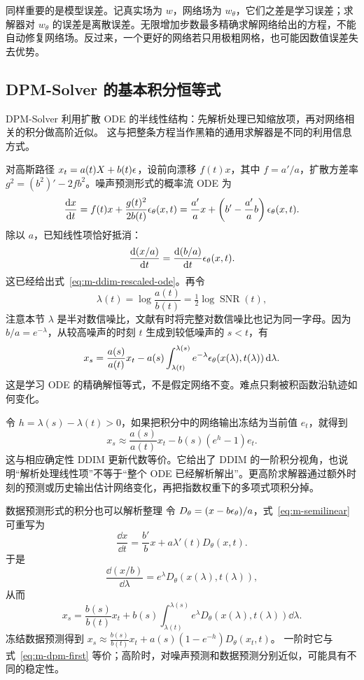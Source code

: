 同样重要的是模型误差。记真实场为 $w$，网络场为 $w_\theta$，它们之差是学习误差；求解器对 $w_\theta$ 的误差是离散误差。无限增加步数最多精确求解网络给出的方程，不能自动修复网络场。反过来，一个更好的网络若只用极粗网格，也可能因数值误差失去优势。

\subsection{DPM-Solver 的基本积分恒等式}

DPM-Solver 利用扩散 ODE 的半线性结构：先解析处理已知缩放项，再对网络相关的积分做高阶近似。\cite{m_dpmsolver} 这与把整条方程当作黑箱的通用求解器是不同的利用信息方式。

对高斯路径 $x_t=a(t)X+b(t)\epsilon$，设前向漂移
$f(t)x$，其中 $f=a'/a$，扩散方差率
$g^2=(b^2)'-2fb^2$。噪声预测形式的概率流 ODE 为
\begin{equation}
\frac{\mathop{}\!\mathrm{d} x}{\mathop{}\!\mathrm{d} t}
=f(t)x+\frac{g(t)^2}{2b(t)}\epsilon_\theta(x,t)
=\frac{a'}{a}x+\left(b'-\frac{a'}{a}b\right)\epsilon_\theta(x,t).
\label{eq:m-semilinear}
\end{equation}
除以 $a$，已知线性项恰好抵消：
\[
 \frac{\mathop{}\!\mathrm{d}(x/a)}{\mathop{}\!\mathrm{d} t}
 =\frac{\mathop{}\!\mathrm{d}(b/a)}{\mathop{}\!\mathrm{d} t}\epsilon_\theta(x,t).
\]
这已经给出式~\eqref{eq:m-ddim-rescaled-ode}。再令
\[
 \lambda(t)=\log\frac{a(t)}{b(t)}
 =\tfrac12\log\operatorname{SNR}(t),
\]
注意本节 $\lambda$ 是半对数信噪比，文献有时将完整对数信噪比也记为同一字母。因为 $b/a=e^{-\lambda}$，从较高噪声的时刻 $t$ 生成到较低噪声的 $s<t$，有
\begin{equation}
x_s=\frac{a(s)}{a(t)}x_t
-a(s)\int_{\lambda(t)}^{\lambda(s)}
e^{-\lambda}\epsilon_\theta(x(\lambda),t(\lambda))\mathop{}\!\mathrm{d}\lambda.
\label{eq:m-dpm-exact}
\end{equation}
这是学习 ODE 的精确解恒等式，不是假定网络不变。难点只剩被积函数沿轨迹如何变化。

令 $h=\lambda(s)-\lambda(t)>0$，如果把积分中的网络输出冻结为当前值 $e_t$，就得到
\begin{equation}
x_s\approx\frac{a(s)}{a(t)}x_t
-b(s)(e^h-1)e_t.
\label{eq:m-dpm-first}
\end{equation}
这与相应确定性 DDIM 更新代数等价。它给出了 DDIM 的一阶积分视角，也说明“解析处理线性项”不等于“整个 ODE 已经解析解出”。更高阶求解器通过额外时刻的预测或历史输出估计网络变化，再把指数权重下的多项式项积分掉。

\begin{derivationbox}{数据预测形式的积分也可以解析整理}
令 $D_\theta=(x-b\epsilon_\theta)/a$，式~\eqref{eq:m-semilinear} 可重写为
\[
 \frac{\dd x}{\dd t}
 =\frac{b'}b x+a\lambda'(t)D_\theta(x,t).
\]
于是
\[
 \frac{\dd(x/b)}{\dd\lambda}
 =e^\lambda D_\theta(x(\lambda),t(\lambda)),
\]
从而
\[
 x_s=\frac{b(s)}{b(t)}x_t+
 b(s)\int_{\lambda(t)}^{\lambda(s)}
 e^\lambda D_\theta(x(\lambda),t(\lambda))\dd\lambda.
\]
冻结数据预测得到
$x_s\approx\frac{b(s)}{b(t)}x_t+
a(s)(1-e^{-h})D_\theta(x_t,t)$。
一阶时它与式~\eqref{eq:m-dpm-first} 等价；高阶时，对噪声预测和数据预测分别近似，可能具有不同的稳定性。
\end{derivationbox}


